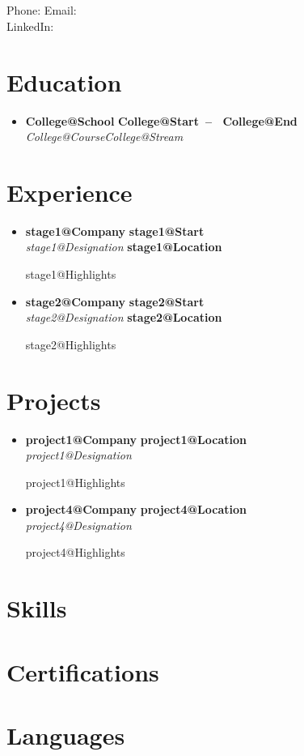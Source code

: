 \documentclass[letterpaper,11pt]{article}
\makeatletter
\newcommand{\resumeSubheading}[4]{
  \vspace{-2pt}\item
    \textbf{#1} \hfill \textbf{\small #2} \\
    \textit{\small#3} \hfill \textbf{\small #4}
    \vspace{-5pt}
}
\newcommand{\resumeSubHeadingListStart}{\begin{itemize}[leftmargin=0.15in, label={}]}
\newcommand{\resumeSubHeadingListEnd}{\end{itemize}}
\def\titlesection{
\begin{center}
    {\Huge \firstname \ \lastname} \\ \vspace{2pt}
    \normalsize \textit{\role} \\ \vspace{4pt}
    \small Phone: \jasphone \quad Email: \email \\
    LinkedIn: \linkedin
    \vspace{-8pt}
\end{center}
}
\newcommand{\renderExp}[1]{
  \resumeSubheading
      {\csname #1@Company\endcsname}{\csname #1@Location\endcsname}
      {\csname #1@Designation\endcsname}{}
  \csname #1@Highlights\endcsname
}
\newcommand{\renderStage}[1]{
  \resumeSubheading
      {\csname #1@Company\endcsname}{\csname #1@Start\endcsname}
      {\csname #1@Designation\endcsname}{\csname #1@Location\endcsname}
  \csname #1@Highlights\endcsname
}
\makeatother
\begin{document}
\titlesection

\vspace{1em}

\section{Education}
  \resumeSubHeadingListStart
      \resumeSubheading{\csname College@School\endcsname}
      {\csname College@Start\endcsname \ -- \ \csname College@End\endcsname}
      {\csname College@Course\endcsname \csname College@Stream\endcsname}{}
  \resumeSubHeadingListEnd

\section{Experience}
  \resumeSubHeadingListStart
    \renderStage{stage1}
    \renderStage{stage2}
  \resumeSubHeadingListEnd

\section{Projects}
  \resumeSubHeadingListStart
    \renderExp{project1}
    \renderExp{project4}
  \resumeSubHeadingListEnd

\section{Skills}
\skills

\section{Certifications}
\certifications

\section{Languages}
\langs
\end{document}
